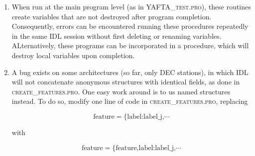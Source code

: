 \documentclass[12pt,preprint]{aastex}
\begin{document}
\begin{enumerate}

\item When run at the main program level (as in \textsc{YAFTA\_test.pro}),
these routines create variables that are not destroyed after program
completion.  Consequently, errors can be encountered running these
procedures repeatedly in the same IDL session without first deleting or
renaming variables.  ALternatively, these programs can be incorporated in
a procedure, which will destroy local variables upon completion.

\item A bug exists on some architectures (so far, only DEC stations), in
which IDL will not concatenate anonymous structures with identical fields,
as done in \textsc{create\_features.pro}.  One easy work around is to us
named structures instead.  To do so, modify one line of code in
\textsc{create\_features.pro}, replacing

\[ \mbox{feature} = \mbox{\{label:label\_j,} \cdots \]

with 

\[ \mbox{feature} = \mbox{\{feature,label:label\_j,} \cdots \]


\end{enumerate}
\end{document}
